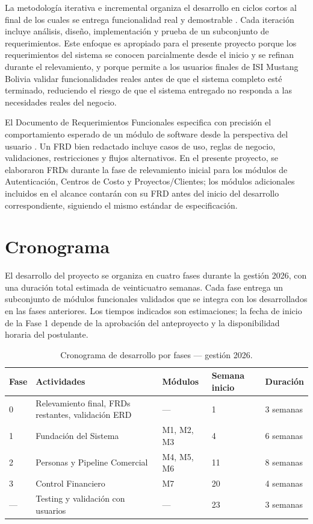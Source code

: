 \documentclass{univalle-perfil}
\begin{document}
La metodología iterativa e incremental organiza el desarrollo en ciclos cortos al final de los cuales se entrega funcionalidad real y demostrable \parencite{larman2004}. Cada iteración incluye análisis, diseño, implementación y prueba de un subconjunto de requerimientos. Este enfoque es apropiado para el presente proyecto porque los requerimientos del sistema se conocen parcialmente desde el inicio y se refinan durante el relevamiento, y porque permite a los usuarios finales de ISI Mustang Bolivia validar funcionalidades reales antes de que el sistema completo esté terminado, reduciendo el riesgo de que el sistema entregado no responda a las necesidades reales del negocio.

El Documento de Requerimientos Funcionales especifica con precisión el comportamiento esperado de un módulo de software desde la perspectiva del usuario \parencite{wiegers2013}. Un FRD bien redactado incluye casos de uso, reglas de negocio, validaciones, restricciones y flujos alternativos. En el presente proyecto, se elaboraron FRDs durante la fase de relevamiento inicial para los módulos de Autenticación, Centros de Costo y Proyectos/Clientes; los módulos adicionales incluidos en el alcance contarán con su FRD antes del inicio del desarrollo correspondiente, siguiendo el mismo estándar de especificación.

\section{Cronograma}

El desarrollo del proyecto se organiza en cuatro fases durante la gestión 2026, con una duración total estimada de veinticuatro semanas. Cada fase entrega un subconjunto de módulos funcionales validados que se integra con los desarrollados en las fases anteriores. Los tiempos indicados son estimaciones; la fecha de inicio de la Fase 1 depende de la aprobación del anteproyecto y la disponibilidad horaria del postulante.

\begin{table}[H]
\centering
\caption{Cronograma de desarrollo por fases — gestión 2026.}
\begin{tabular}{p{}p{}p{}p{}p{}}
\toprule
\textbf{Fase} & \textbf{Actividades} & \textbf{Módulos} & \textbf{Semana inicio} & \textbf{Duración} \\
\midrule
0 & Relevamiento final, FRDs restantes, validación ERD & --- & 1 & 3 semanas \\
1 & Fundación del Sistema & M1, M2, M3 & 4 & 6 semanas \\
2 & Personas y Pipeline Comercial & M4, M5, M6 & 11 & 8 semanas \\
3 & Control Financiero & M7 & 20 & 4 semanas \\
--- & Testing y validación con usuarios & --- & 23 & 3 semanas \\
\bottomrule
\end{tabular}
\end{table}
\end{document}
